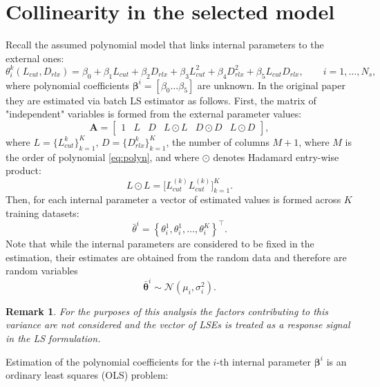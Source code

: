 \documentclass[a4paper,11pt,twoside]{article}
\theoremstyle{mytheoremstyle}
\newtheorem{remark}{Remark}[section]
\begin{document}
\section{Collinearity in the selected model}
\par Recall the assumed polynomial model that links internal parameters to the external ones:
\begin{equation}\label{eq:polyn}
\theta^{k}_{i}(L_{cut},D_{rlx}) = \beta_0 + \beta_1 L_{cut} + \beta_2 D_{rlx} + \beta_3 L_{cut}^{2} + \beta_4 D_{rlx}^{2} + \beta_5 L_{cut} D_{rlx}, \qquad i=1,\dots,N_s,
\end{equation}
where polynomial coefficients $\mathbf{\beta}^i = \left[ \beta_0 \dots \beta_5 \right]$ are unknown. In the original paper \cite{Wei2008} they are estimated via batch LS estimator as follows. First, the matrix of "independent" variables is formed from the external parameter values:
\begin{equation}
\mathbf{A} = \left[\begin{array}{cccccc}
1 & L& D& L\odot L& D \odot D& L\odot  D
\end{array}\right],
\end{equation}
where $L = \{L_{cut}^{k}\}^{K}_{k=1}$, $D = \{D_{rlx}^{k}\}^{K}_{k=1}$, the number of columns $M + 1$, where $M$ is the order of polynomial \eqref{eq:polyn}, and where $\odot$ denotes Hadamard entry-wise product:
\begin{equation*}
L\odot L = \Big[ L_{cut}^{(k)} L_{cut}^{(k)}\Big]^{K}_{k=1}.
\end{equation*}
Then, for each internal parameter a vector of estimated values is formed across $K$ training datasets:
\begin{equation*}
\bar{\theta}^i = \left\{ \theta^{1}_{i}, \theta^{1}_{i}, \dots, \theta^{K}_{i} \right\}^{\top}.
\end{equation*}
Note that while the internal parameters are considered to be fixed in the estimation, their estimates are obtained from the random data and therefore are random variables 
\begin{equation*}
\bar{\mathbf{\theta}}^i \sim \mathcal{N}(\mu_i, \sigma^{2}_{i}).
\end{equation*}
\begin{remark}
For the purposes of this analysis the factors contributing to this variance are not considered and the vector of LSEs is treated as a response signal in the LS formulation.
\end{remark}
Estimation of the polynomial coefficients for the $i$-th internal parameter $\mathbf{\beta}^i$ is an ordinary least squares (OLS) problem:
\end{document}
